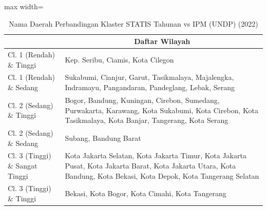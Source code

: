 \begin{table}[H]
\centering
\caption{Nama Daerah Perbandingan Klaster STATIS Tahunan vs IPM (UNDP) (2022)} \label{tab:app2statis_ipm_name_2022}
\begin{adjustbox}{max width=\textwidth}
\begin{tabular}{|>{\centering\arraybackslash}p{4cm}|p{10cm}|}
\hline
\multicolumn{1}{|c|}{\textbf{Kategori}} & \multicolumn{1}{c|}{\textbf{Daftar Wilayah}} \\
\hline
Cl. 1 (Rendah) \& Tinggi & Kep. Seribu, Ciamis, Kota Cilegon \\
\hline
Cl. 1 (Rendah) \& Sedang & Sukabumi, Cianjur, Garut, Tasikmalaya, Majalengka, Indramayu, Pangandaran, Pandeglang, Lebak, Serang \\
\hline
Cl. 2 (Sedang) \& Tinggi & Bogor, Bandung, Kuningan, Cirebon, Sumedang, Purwakarta, Karawang, Kota Sukabumi, Kota Cirebon, Kota Tasikmalaya, Kota Banjar, Tangerang, Kota Serang \\
\hline
Cl. 2 (Sedang) \& Sedang & Subang, Bandung Barat \\
\hline
Cl. 3 (Tinggi) \& Sangat Tinggi & Kota Jakarta Selatan, Kota Jakarta Timur, Kota Jakarta Pusat, Kota Jakarta Barat, Kota Jakarta Utara, Kota Bandung, Kota Bekasi, Kota Depok, Kota Tangerang Selatan \\
\hline
Cl. 3 (Tinggi) \& Tinggi & Bekasi, Kota Bogor, Kota Cimahi, Kota Tangerang \\
\hline
\end{tabular}
\end{adjustbox}
\end{table}